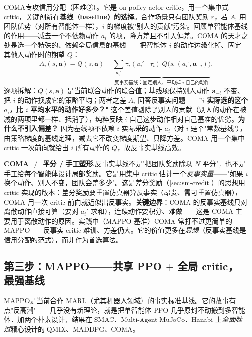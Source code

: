COMA\cite{foerster2018coma}专攻信用分配（困难②）。它是 on-policy actor-critic，用一个集中式 critic，关键创新在\textbf{基线（baseline）的选择}。合作场景只有团队奖励 $r$，若 $A_i$ 用团队优势（对所有智能体一样），$i$ 的梯度被"别人的贡献"污染。回顾单智能体基线的作用——减去一个不依赖动作 $a_i$ 的项，降方差且不引入偏差。COMA 的天才之处是选一个特殊的、依赖全局信息的基线——把智能体 $i$ 的动作边缘化掉、固定其他人动作时的期望 $Q$：
\begin{equation}
  A_i(s,\mathbf{a})=Q(s,\mathbf{a})-\underbrace{\sum_{a_i'}\pi_i(a_i'\mid\tau_i)\,Q\big(s,(a_i',\mathbf{a}_{-i})\big)}_{\text{反事实基线：固定别人、平均掉 }i\text{ 自己的动作}}.
  \label{eq:sm-coma}
\end{equation}
逐项拆解：$Q(s,\mathbf{a})$ 是当前联合动作的联合值；基线项保持别人动作 $\mathbf{a}_{-i}$ 不变、把 $i$ 的动作换成它的策略平均；两者之差 $A_i$ 回答反事实问题——\textbf{"$i$ 实际选的这个 $a_i$，比 $i$ 平均水平的动作好多少？"} 这个差值剔除了别人的贡献（别人的动作在被减的两项里都一样、抵消了），纯粹反映 $i$ 自己这步动作相对自己基准的优劣。\textbf{为什么不引入偏差？} 因为基线项不依赖 $i$ 实际采的动作 $a_i$（对 $i$ 是个"常数基线"），由策略梯度的基线定理，减去它不改变梯度期望、只降方差。COMA 用一个集中 critic 一次前向就给出 $i$ 所有动作的 $Q$，故反事实基线高效。

\begin{note}
\textbf{COMA $\neq$ 平分 / 手工塑形.}\;反事实基线不是"把团队奖励除以 $N$ 平分"，也不是手工给每个智能体设计局部奖励。它是用集中 critic 估计一个\emph{反事实量}——"如果 $i$ 换个动作、别人不变，团队会差多少"。这是差分奖励（\cref{sec:sm-credit}）的思想用 critic 实现的版本：差分奖励要重置仿真器算反事实（昂贵、需可重置仿真器），COMA 用一次 critic 前向就近似出反事实。\textbf{关键边界}：COMA 的反事实基线只对离散动作直接可算（要对 $a_i'$ 求和），连续动作要积分、难做——这是 COMA 主要用于离散动作的原因。实践中（MAPPO 基准）COMA 常打不过更简单的 MAPPO——反事实 critic 难训、方差仍大。它的价值更多在\emph{思想}（反事实基线是信用分配的范式），而非作为首选算法。
\end{note}

\subsection{第三步：MAPPO——共享 PPO \texorpdfstring{$+$}{+} 全局 critic，最强基线}

MAPPO\cite{yu2022mappo}是当前合作 MARL（尤其机器人领域）的事实标准基线。它的故事有点"反高潮"——几乎没有新理论，就是把单智能体 PPO 几乎原封不动搬到多智能体、加两个朴素设计，结果在 SMAC、Multi-Agent MuJoCo、Hanabi 上\emph{全面胜过}精心设计的 QMIX、MADDPG、COMA。

